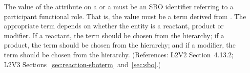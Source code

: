 The value of the  attribute on a \SpeciesReference or a
\ModifierSpeciesReference must be an SBO identifier referring to a
participant functional role.  That is, the value must be a term derived
from \sboparticipantfunctional.  The appropriate term depends on whether
the entity is a reactant, product or modifier.  If a reactant, the term
should be chosen from the \sboreactant hierarchy; if a product, the term
should be chosen from the \sboproduct hierarchy; and if a modifier, the
term should be chosen from the \sbomodifier hierarchy.  (References: 
L2V2 Section~4.13.2; L2V3 Sections~\ref{sec:reaction-sboterm} and~\ref{sec:sbo}.)
